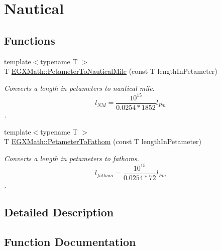 \hypertarget{group___e_g_x_math-_conversions-_length_conversions-_petameter-_nautical}{}\section{Nautical}
\label{group___e_g_x_math-_conversions-_length_conversions-_petameter-_nautical}
\subsection*{Functions}
\begin{DoxyCompactItemize}
\item 
{\footnotesize template$<$typename T $>$ }\\T \mbox{\hyperlink{group___e_g_x_math-_conversions-_length_conversions-_petameter-_nautical_gad71d96fd4a94e830ae0e768a41d993af}{E\+G\+X\+Math\+::\+Petameter\+To\+Nautical\+Mile}} (const T length\+In\+Petameter)
\begin{DoxyCompactList}\small\item\em Converts a length in petameters to nautical mile. \[ l_{NM}= \frac{10^{15}}{0.0254 * 1852} l_{Pm} \]. \end{DoxyCompactList}\item 
{\footnotesize template$<$typename T $>$ }\\T \mbox{\hyperlink{group___e_g_x_math-_conversions-_length_conversions-_petameter-_nautical_ga889ce7d71b84adea6f568fed8857fbab}{E\+G\+X\+Math\+::\+Petameter\+To\+Fathom}} (const T length\+In\+Petameter)
\begin{DoxyCompactList}\small\item\em Converts a length in petameters to fathoms. \[ l_{fathom}= \frac{10^{15}}{0.0254 * 72} l_{Pm} \]. \end{DoxyCompactList}\end{DoxyCompactItemize}


\subsection{Detailed Description}


\subsection{Function Documentation}
\mbox{\label{group___e_g_x_math-_conversions-_length_conversions-_petameter-_nautical_ga889ce7d71b84adea6f568fed8857fbab}} 
